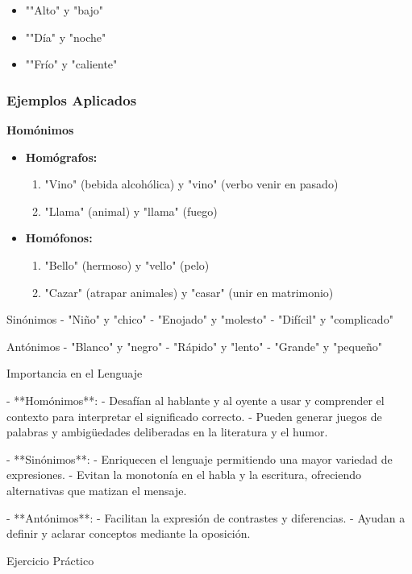 \begin{itemize}
      \item ""Alto" y "bajo"
      \item ""Día" y "noche"
      \item ""Frío" y "caliente"
\end{itemize}

\subsubsection{Ejemplos Aplicados}

\textbf{Homónimos}
\begin{itemize}
      \item \textbf{Homógrafos:}
            \begin{enumerate}
                  \item "Vino" (bebida alcohólica) y "vino" (verbo venir en pasado)
                  \item "Llama" (animal) y "llama" (fuego)
            \end{enumerate}
      \item \textbf{Homófonos:}
            \begin{enumerate}
                  \item "Bello" (hermoso) y "vello" (pelo)
                  \item "Cazar" (atrapar animales) y "casar" (unir en matrimonio)
            \end{enumerate}
\end{itemize}

Sinónimos
- "Niño" y "chico"
- "Enojado" y "molesto"
- "Difícil" y "complicado"

Antónimos
- "Blanco" y "negro"
- "Rápido" y "lento"
- "Grande" y "pequeño"

Importancia en el Lenguaje

- **Homónimos**:
- Desafían al hablante y al oyente a usar y comprender el contexto para interpretar el significado correcto.
- Pueden generar juegos de palabras y ambigüedades deliberadas en la literatura y el humor.

- **Sinónimos**:
- Enriquecen el lenguaje permitiendo una mayor variedad de expresiones.
- Evitan la monotonía en el habla y la escritura, ofreciendo alternativas que matizan el mensaje.

- **Antónimos**:
- Facilitan la expresión de contrastes y diferencias.
- Ayudan a definir y aclarar conceptos mediante la oposición.

Ejercicio Práctico


